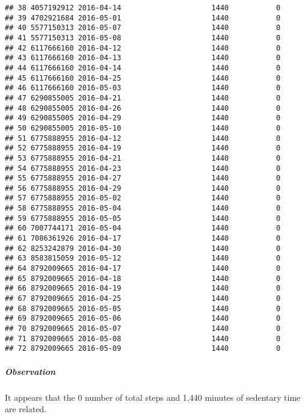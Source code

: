 \documentclass[
]{article}
\begin{document}
\begin{verbatim}
## 38 4057192912 2016-04-14                     1440           0
## 39 4702921684 2016-05-01                     1440           0
## 40 5577150313 2016-05-07                     1440           0
## 41 5577150313 2016-05-08                     1440           0
## 42 6117666160 2016-04-12                     1440           0
## 43 6117666160 2016-04-13                     1440           0
## 44 6117666160 2016-04-14                     1440           0
## 45 6117666160 2016-04-25                     1440           0
## 46 6117666160 2016-05-03                     1440           0
## 47 6290855005 2016-04-21                     1440           0
## 48 6290855005 2016-04-26                     1440           0
## 49 6290855005 2016-04-29                     1440           0
## 50 6290855005 2016-05-10                     1440           0
## 51 6775888955 2016-04-12                     1440           0
## 52 6775888955 2016-04-19                     1440           0
## 53 6775888955 2016-04-21                     1440           0
## 54 6775888955 2016-04-23                     1440           0
## 55 6775888955 2016-04-27                     1440           0
## 56 6775888955 2016-04-29                     1440           0
## 57 6775888955 2016-05-02                     1440           0
## 58 6775888955 2016-05-04                     1440           0
## 59 6775888955 2016-05-05                     1440           0
## 60 7007744171 2016-05-04                     1440           0
## 61 7086361926 2016-04-17                     1440           0
## 62 8253242879 2016-04-30                     1440           0
## 63 8583815059 2016-05-12                     1440           0
## 64 8792009665 2016-04-17                     1440           0
## 65 8792009665 2016-04-18                     1440           0
## 66 8792009665 2016-04-19                     1440           0
## 67 8792009665 2016-04-25                     1440           0
## 68 8792009665 2016-05-05                     1440           0
## 69 8792009665 2016-05-06                     1440           0
## 70 8792009665 2016-05-07                     1440           0
## 71 8792009665 2016-05-08                     1440           0
## 72 8792009665 2016-05-09                     1440           0
\end{verbatim}

\hypertarget{observation-5}{%
\subparagraph{Observation}\label{observation-5}}

It appears that the 0 number of total steps and 1,440 minutes of
sedentary time are related.
\end{document}
